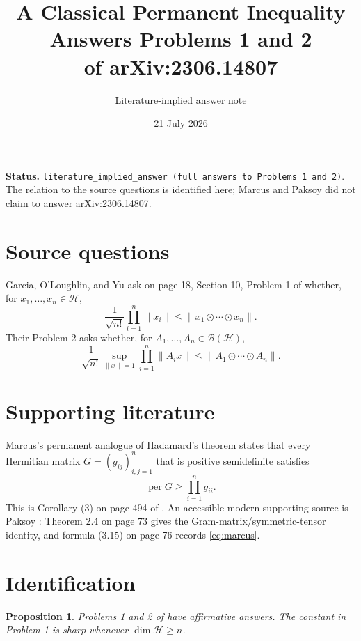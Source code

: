 \documentclass[11pt]{article}
\title{A Classical Permanent Inequality Answers Problems 1 and 2\\
of arXiv:2306.14807}
\author{Literature-implied answer note}
\date{21 July 2026}
\newtheorem*{proposition}{Proposition}
\newcommand{\Hh}{\mathcal H}
\newcommand{\permanent}{\operatorname{per}}
\begin{document}
\maketitle

\noindent\textbf{Status.}
\texttt{literature\_implied\_answer (full answers to Problems 1 and 2)}.
The relation to the source questions is identified here; Marcus and Paksoy did
not claim to answer arXiv:2306.14807.

\section*{Source questions}
Garcia, O'Loughlin, and Yu ask on page 18, Section 10, Problem 1 of
\cite{GOY} whether, for $x_1,\ldots,x_n\in\Hh$,
\[
 \frac{1}{\sqrt{n!}}\prod_{i=1}^n\|x_i\|
 \leq \|x_1\odot\cdots\odot x_n\|.
\]
Their Problem 2 asks whether, for $A_1,\ldots,A_n\in\mathcal B(\Hh)$,
\[
 \frac{1}{\sqrt{n!}}
 \sup_{\|x\|=1}\prod_{i=1}^n\|A_i x\|
 \leq \|A_1\odot\cdots\odot A_n\|.
\]

\section*{Supporting literature}
Marcus's permanent analogue of Hadamard's theorem states that every Hermitian
matrix $G=(g_{ij})_{i,j=1}^n$ that is positive semidefinite satisfies
\begin{equation}\label{eq:marcus}
 \permanent G\geq\prod_{i=1}^n g_{ii}.
\end{equation}
This is Corollary (3) on page 494 of \cite{Marcus}. An accessible modern
supporting source is Paksoy \cite{Paksoy}: Theorem 2.4 on page 73 gives the
Gram-matrix/symmetric-tensor identity, and formula (3.15) on page 76 records
\eqref{eq:marcus}.

\section*{Identification}
\begin{proposition}
Problems 1 and 2 of \cite{GOY} have affirmative answers. The constant in
Problem 1 is sharp whenever $\dim\Hh\geq n$.
\end{proposition}
\end{document}
